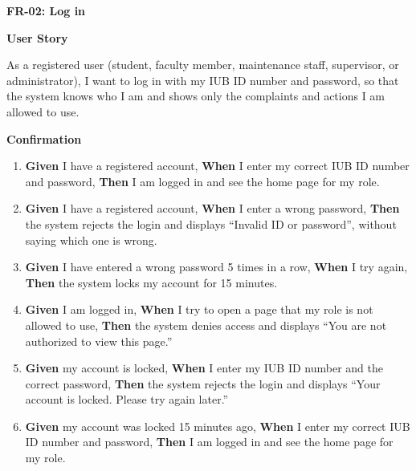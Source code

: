 \noindent\textbf{FR-02: Log in}\par\nopagebreak[4]\smallskip
\noindent\textbf{User Story}\par\nopagebreak[4]
\noindent As a registered user (student, faculty member, maintenance staff, supervisor, or administrator), I want to log in with my IUB ID number and password, so that the system knows who I am and shows only the complaints and actions I am allowed to use.\par\smallskip
{\makeatletter
{}
\makeatother
\noindent\textbf{Confirmation}\par\nopagebreak[4]\vspace{-6pt}\nopagebreak[4]
\begin{enumerate}\setlength{\itemsep}{2pt}\setlength{\parsep}{0pt}\setlength{\topsep}{2pt}\setlength{\partopsep}{0pt}
  \item \textbf{Given} I have a registered account, \textbf{When} I enter my correct IUB ID number and password, \textbf{Then} I am logged in and see the home page for my role.
  \item \textbf{Given} I have a registered account, \textbf{When} I enter a wrong password, \textbf{Then} the system rejects the login and displays ``Invalid ID or password'', without saying which one is wrong.
  \item \textbf{Given} I have entered a wrong password 5 times in a row, \textbf{When} I try again, \textbf{Then} the system locks my account for 15 minutes.
  \item \textbf{Given} I am logged in, \textbf{When} I try to open a page that my role is not allowed to use, \textbf{Then} the system denies access and displays ``You are not authorized to view this page.''
  \item \textbf{Given} my account is locked, \textbf{When} I enter my IUB ID number and the correct password, \textbf{Then} the system rejects the login and displays ``Your account is locked. Please try again later.''
  \item \textbf{Given} my account was locked 15 minutes ago, \textbf{When} I enter my correct IUB ID number and password, \textbf{Then} I am logged in and see the home page for my role.
\end{enumerate}}
\medskip
 
